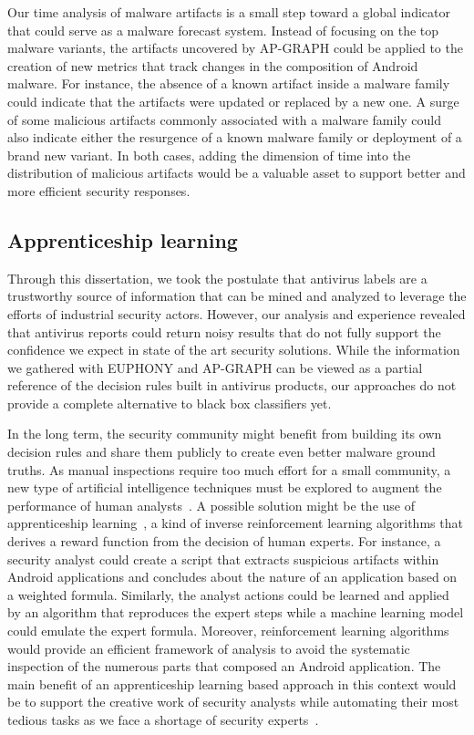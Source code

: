 Our time analysis of malware artifacts is a small step toward a global indicator that could serve as a malware forecast system.
Instead of focusing on the top malware variants, the artifacts uncovered by AP-GRAPH could be applied to the creation of new metrics that track changes in the composition of Android malware.
For instance, the absence of a known artifact inside a malware family could indicate that the artifacts were updated or replaced by a new one.
A surge of some malicious artifacts commonly associated with a malware family could also indicate either the resurgence of a known malware family or deployment of a brand new variant.
In both cases, adding the dimension of time into the distribution of malicious artifacts would be a valuable asset to support better and more efficient security responses.
\subsection{Apprenticeship learning}
Through this dissertation, we took the postulate that antivirus labels are a trustworthy source of information that can be mined and analyzed to leverage the efforts of industrial security actors.
However, our analysis and experience revealed that antivirus reports could return noisy results that do not fully support the confidence we expect in state of the art security solutions.
While the information we gathered with EUPHONY and AP-GRAPH can be viewed as a partial reference of the decision rules built in antivirus products, our approaches do not provide a complete alternative to black box classifiers yet.

In the long term, the security community might benefit from building its own decision rules and share them publicly to create even better malware ground truths.
As manual inspections require too much effort for a small community, a new type of artificial intelligence techniques must be explored to augment the performance of human analysts~\cite{veeramachaneni_ai2:_2016}.
A possible solution might be the use of apprenticeship learning~\cite{abbeel_apprenticeship_2004}, a kind of inverse reinforcement learning algorithms that derives a reward function from the decision of human experts.
For instance, a security analyst could create a script that extracts suspicious artifacts within Android applications and concludes about the nature of an application based on a weighted formula.
Similarly, the analyst actions could be learned and applied by an algorithm that reproduces the expert steps while a machine learning model could emulate the expert formula.
Moreover, reinforcement learning algorithms would provide an efficient framework of analysis to avoid the systematic inspection of the numerous parts that composed an Android application.
The main benefit of an apprenticeship learning based approach in this context would be to support the creative work of security analysts while automating their most tedious tasks as we face a shortage of security experts~\cite{ics2_cybersecurity_2018}.
